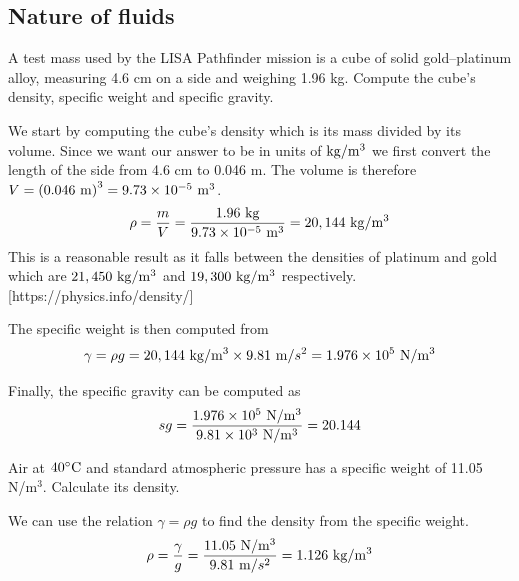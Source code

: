 \documentclass[multi,preview,varwidth=false,border=5,12pt]{standalone}
\begin{document}
\begin{center}
\section*{Nature of fluids}
\end{center}

\begin{question}
A test mass used by the LISA Pathfinder mission is a cube of solid gold--platinum alloy, measuring 4.6 cm on a side and weighing 1.96 kg.  Compute the cube's density, specific weight and specific gravity.

\begin{solution}
  We start by computing the cube's density which is its mass divided by its volume.  Since we want our answer to be in units of $\mathrm{kg}/\mathrm{m}^3$ we first convert the length of the side from 4.6 cm to 0.046 m.  The volume is therefore $V=\left(0.046~\mathrm{m}\right)^3=9.73\times 10^{-5}~\mathrm{m}^3$.
  \begin{align*}
  \rho=\frac{m}{V}=\frac{1.96~\mathrm{kg}}{9.73\times 10^{-5}~\mathrm{m}^3}=20,144~\mathrm{kg}/\mathrm{m}^3
  \end{align*}
  This is a reasonable result as it falls between the densities of platinum and gold which are $21,450~\mathrm{kg}/\mathrm{m}^3$ and  $19,300~\mathrm{kg}/\mathrm{m}^3$ respectively. [https://physics.info/density/]

  The specific weight is then computed from
  \begin{align*}
  \gamma=\rho g=20,144~\mathrm{kg}/\mathrm{m}^3\times 9.81~\mathrm{m}/s^2=1.976\times 10^5~\mathrm{N}/\mathrm{m}^3
  \end{align*}

  Finally, the specific gravity can be computed as
  \begin{align*}
  sg=\frac{1.976\times 10^5~\mathrm{N}/\mathrm{m}^3}{9.81\times 10^3~\mathrm{N}/\mathrm{m}^3}=20.144
  \end{align*}
\end{solution}
\end{question}


\begin{question}
Air at $40^\circ\mathrm{C}$ and standard atmospheric pressure has a specific weight of 11.05 N/m$^3$.
Calculate its density.

\begin{solution}
  We can use the relation $\gamma=\rho g$ to find the density from the specific weight.
  \begin{align*}
      \rho=\frac{\gamma}{g}=\frac{11.05~\mathrm{N}/\mathrm{m}^3}{9.81~\mathrm{m}/s^2}=1.126~\mathrm{kg}/\mathrm{m}^3
  \end{align*}
\end{solution}

\end{question}
\end{document}
